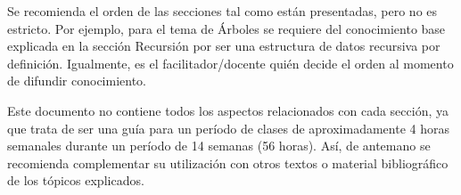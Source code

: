Se recomienda el orden de las secciones tal como están presentadas, pero no es estricto. Por ejemplo, para el tema de Árboles se requiere del conocimiento base explicada en la sección Recursión por ser una estructura de datos recursiva por definición. Igualmente, es el facilitador/docente quién decide el orden al momento de difundir conocimiento.

Este documento no contiene todos los aspectos relacionados con cada sección, ya que trata de ser una guía para un período de clases de aproximadamente 4 horas semanales durante un período de 14 semanas (56 horas). Así, de antemano se recomienda complementar su utilización con otros textos o material bibliográfico de los tópicos explicados.